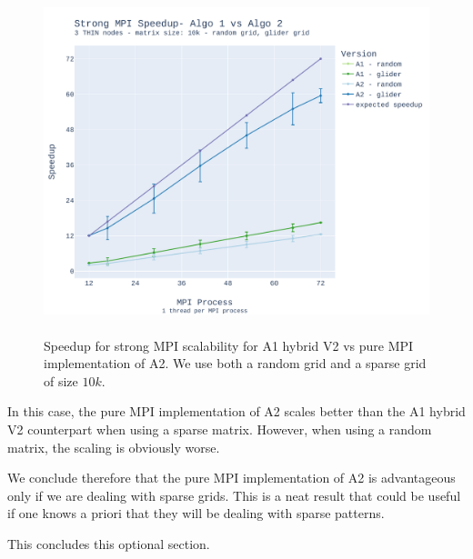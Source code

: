 \documentclass{report}
\begin{document}
\begin{figure}[H]
\centering
\includegraphics[width=14cm, height=10cm]{./images/a1_v_a2_static_grid_010k_speedup.pdf}
\caption{\label{fig:strongmpiepychybridspeedup} Speedup for strong MPI scalability 
for A1 hybrid V2 vs pure MPI implementation of A2. We use both a 
random grid and a sparse grid of size $10k$.}
\end{figure}

In this case, the pure MPI implementation of A2 scales better than the A1 hybrid V2 
counterpart when using a sparse matrix. However, when using a random matrix, the 
scaling is obviously worse.

We conclude therefore that the pure MPI implementation of A2 is advantageous only 
if we are dealing with sparse grids. This is a neat result that could be useful 
if one knows a priori that they will be dealing with sparse patterns. 

This concludes this optional section.
\printbibliography
\end{document}
